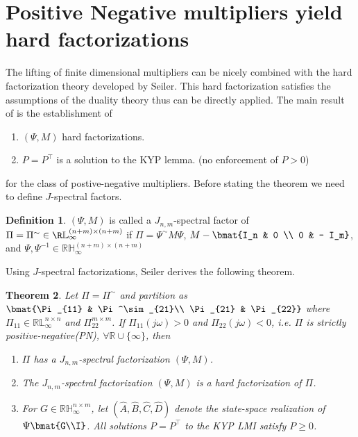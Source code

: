 \documentclass[11pt,a4paper,onecolumn]{article}
\newtheorem{theorem}{Theorem}
\theoremstyle{definition}
\newtheorem{definition}[theorem]{Definition}
\theoremstyle{remark}
\begin{document}
\section{Positive Negative multipliers yield hard factorizations \cite{6915700}}
The lifting of finite dimensional multipliers can be nicely combined with the hard factorization theory developed by Seiler.
This hard factorization satisfies the assumptions of the duality theory thus can be directly applied. The main result of \cite{6915700} is the establishment of 
\begin{enumerate}
    \item $(\Psi, M)$ hard factorizations.
    \item $P=P^\top$ is a solution to the KYP lemma. (no enforcement of $P>0$)
\end{enumerate}
for the class of postive-negative multipliers. Before stating the theorem we need to define $J$-spectral factors.
\begin{definition}
    $(\Psi, M)$ is called a $J_{n,m}$-spectral factor of $\Pi = \Pi^\sim\in\R\mathbb{L}_\infty^{(n+m)\times(n+m)}$ if $\Pi = \Psi^\sim M \Psi$, $M - \bmat{I_n & 0 \\ 0 & - I_m}$, and
    $\Psi,\Psi^{-1}\in\mathbb{RH}_\infty^{(n+m)\times(n+m)}$
\end{definition}
Using $J$-spectral factorizations, Seiler \cite{6915700} derives the following theorem.
\begin{theorem}
    Let $\Pi=\Pi^\sim$ and partition as $\bmat{\Pi_{11} & \Pi^\sim_{21}\\ \Pi_{21} & \Pi_{22}}$ where $\Pi_{11}\in\mathbb{RL}_\infty^{n\times n}$ and $\Pi_{22}^{m\times m}$. If
    $\Pi_{11}(j \omega)>0$ and $\Pi_{22}(j\omega)<0$, i.e. $\Pi$ is strictly positive-negative(PN), $\forall\mathbb{R}\cup\{\infty\}$, then
    \begin{enumerate}
        \item $\Pi$ has a $J_{n,m}$-spectral factorization $(\Psi, M)$.
        \item The $J_{n,m}$-spectral factorization $(\Psi,M)$ is a hard factorization of $\Pi$.
        \item For $G\in\mathbb{RH}_\infty^{n\times m}$, let $(\hat{A},\hat{B},\hat{C},\hat{D})$ denote the state-space realization of $\Psi\bmat{G\\I}$. All solutions
              $P=P^\top$ to the KYP LMI satisfy $P\geq 0$.
    \end{enumerate}
\end{theorem}



\end{document}
